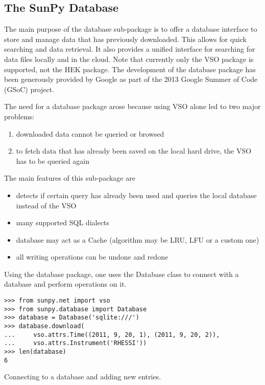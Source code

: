 \subsection{The SunPy Database}
The main purpose of the database sub-package is to offer a database interface to store and manage data
that has previously downloaded. This allows for quick searching and data retrieval. 
It also provides a unified interface for searching for data files locally and in the cloud.
Note that currently only the VSO package is supported, not the HEK package. The development
of the database package has been generously provided by Google as part of the 2013 Google 
Summer of Code (GSoC) project. 

The need for a database package arose because using VSO alone led to two major
problems:
\begin{enumerate}
  \item downloaded data cannot be queried or browsed
  \item to fetch data that has already been saved on the local hard drive,
    the VSO has to be queried again
\end{enumerate}

The main features of this sub-package are
\begin{itemize}
  \item detects if certain query has already been used and queries
    the local database instead of the VSO
  \item many supported SQL dialects
  \item database may act as a Cache (algorithm may be LRU, LFU or a custom one)
  \item all writing operations can be undone and redone
\end{itemize}

Using the database package, one uses the Database class to connect with a
database and perform operations on it.

\begin{listing}
\begin{verbatim}
>>> from sunpy.net import vso
>>> from sunpy.database import Database
>>> database = Database('sqlite:///')
>>> database.download(
...     vso.attrs.Time((2011, 9, 20, 1), (2011, 9, 20, 2)),
...     vso.attrs.Instrument('RHESSI'))
>>> len(database)
6
\end{verbatim}
\caption{Connecting to a database and adding new entries.}
\label{code:db_1}
\end{listing}

